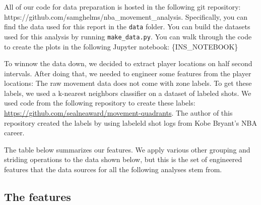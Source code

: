 \documentclass[]{article}
\begin{document}
All of our code for data preparation is hosted in the following git
repository: https://github.com/samghelms/nba\_movement\_analysis.
Specifically, you can find the data used for this report in the
\texttt{data} folder. You can build the datasets used for this analysis
by running \texttt{make\_data.py}. You can walk through the code to
create the plots in the following Jupyter notebook: \{INS\_NOTEBOOK\}

To winnow the data down, we decided to extract player locations on half
second intervals. After doing that, we needed to engineer some features
from the player locations: The raw movement data does not come with zone
labels. To get these labels, we used a k-nearest neighbors classifier on
a dataset of labeled shots. We used code from the following repository
to create these labels:
\url{https://github.com/sealneaward/movement-quadrants}. The author of
this repository created the labels by using labeleld shot logs from Kobe
Bryant's NBA career.

The table below summarizes our features. We apply various other grouping
and striding operations to the data shown below, but this is the set of
engineered features that the data sources for all the following analyses
stem from.

\subsection{The features}\label{the-features}
\end{document}

